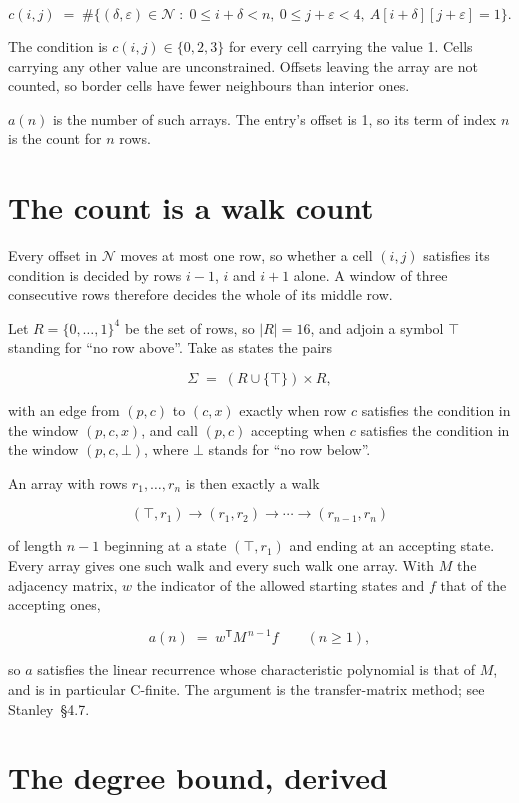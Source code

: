 \documentclass[11pt]{article}
\theoremstyle{definition}
\begin{document}
\[c(i,j) \;=\; \#\bigl\{(\delta,\varepsilon)\in\mathcal{N} \;:\; 0\le i+\delta<n,\ 0\le j+\varepsilon<4,\ A[i+\delta][j+\varepsilon] = 1\bigr\}.\]

The condition is $c(i,j) \in \{0, 2, 3\}$ for every cell carrying the value 1. Cells carrying any other value are unconstrained. Offsets leaving the array are not counted, so border cells have fewer neighbours than interior ones.

$a(n)$ is the number of such arrays. The entry's offset is 1, so its term of index $n$ is the count for $n$ rows.

\section{The count is a walk count}

Every offset in $\mathcal{N}$ moves at most one row, so whether a cell $(i,j)$ satisfies its condition is decided by rows $i-1$, $i$ and $i+1$ alone. A window of three consecutive rows therefore decides the whole of its middle row.

Let $R = \{0,\dots,1\}^{4}$ be the set of rows, so $|R| = 16$, and adjoin a symbol $\top$ standing for ``no row above''. Take as states the pairs

\[\Sigma \;=\; (R \cup \{\top\}) \times R,\]

with an edge from $(p,c)$ to $(c,x)$ exactly when row $c$ satisfies the condition in the window $(p,c,x)$, and call $(p,c)$ accepting when $c$ satisfies the condition in the window $(p,c,\bot)$, where $\bot$ stands for ``no row below''.

An array with rows $r_1,\dots,r_n$ is then exactly a walk

\[(\top,r_1) \to (r_1,r_2) \to \cdots \to (r_{n-1},r_n)\]

of length $n-1$ beginning at a state $(\top,r_1)$ and ending at an accepting state. Every array gives one such walk and every such walk one array. With $M$ the adjacency matrix, $w$ the indicator of the allowed starting states and $f$ that of the accepting ones,

\[a(n) \;=\; w^{\mathsf T} M^{\,n-1} f \qquad (n \ge 1),\]

so $a$ satisfies the linear recurrence whose characteristic polynomial is that of $M$, and is in particular C-finite. The argument is the transfer-matrix method; see Stanley~\S4.7.

\section{The degree bound, derived}
\end{document}
